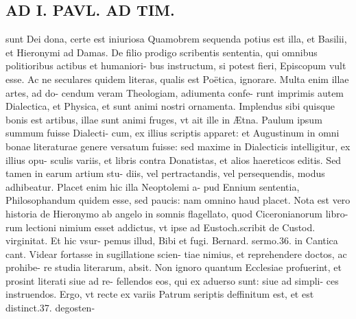 \documentclass{article}
\begin{document}
\begin{pages}
\section*{AD I. PAVL. AD TIM. }
\marginpar{[ p.128 ]}\pstart sunt Dei dona, certe est iniuriosa Quamobrem sequenda potius est illa, et Basilii, et Hieronymi ad Damas. De filio prodigo scribentis sententia, qui omnibus politioribus actibus et humaniori- bus instructum, si potest fieri, Episcopum vult esse. Ac ne seculares quidem literas, qualis est Poëtica, ignorare. Multa enim illae artes, ad do- cendum veram Theologiam, adiumenta confe- runt imprimis autem Dialectica, et Physica, et sunt animi nostri ornamenta. Implendus sibi quisque bonis est artibus, illae sunt animi fruges, vt ait ille in Ætna. Paulum ipsum summum fuisse Dialecti- cum, ex illius scriptis apparet: et Augustinum in omni bonae literaturae genere versatum fuisse: sed maxime in Dialecticis intelligitur, ex illius opu- sculis variis, et libris contra Donatistas, et alios haereticos editis. Sed tamen in earum artium stu- diis, vel pertractandis, vel persequendis, modus adhibeatur. Placet enim hic illa Neoptolemi a- pud Ennium sententia, Philosophandum quidem esse, sed paucis: nam omnino haud placet. Nota est vero historia de Hieronymo ab angelo in somnis flagellato, quod Ciceronianorum libro- rum lectioni nimium esset addictus, vt ipse ad Eustoch.scribit de Custod. virginitat. Et hic vsur- pemus illud, Bibi et fugi. Bernard. sermo.36. in Cantica cant. Videar fortasse in sugillatione scien- tiae nimius, et reprehendere doctos, ac prohibe- re studia literarum, absit. Non ignoro quantum Ecclesiae profuerint, et prosint literati siue ad re- fellendos eos, qui ex aduerso sunt: siue ad simpli- ces instruendos. Ergo, vt recte ex variis Patrum seriptis deffinitum est, et est distinct.37. degosten-  \pend

\end{pages}
\end{document}

